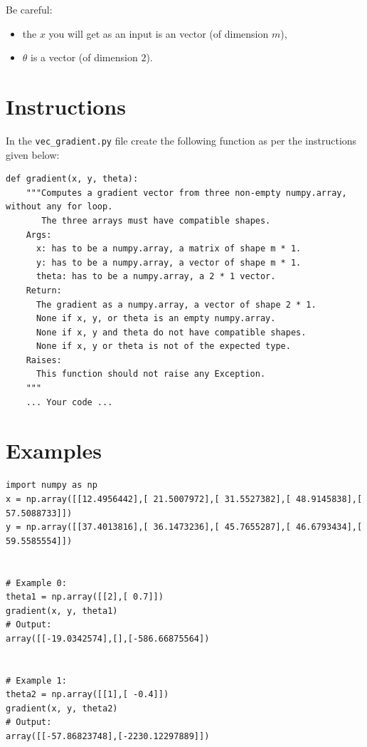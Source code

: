 \documentclass{42-en}
\begin{document}
Be careful:
\begin{itemize}
  \item the $x$ you will get as an input is an vector (of dimension $m$),
  \item $\theta$ is a vector (of dimension $2$).
\end{itemize}

\section*{Instructions}
In the \texttt{vec\_gradient.py} file create the following function as per the instructions given below:
\par
\begin{verbatim}
def gradient(x, y, theta):
    """Computes a gradient vector from three non-empty numpy.array, without any for loop.
       The three arrays must have compatible shapes.
    Args:
      x: has to be a numpy.array, a matrix of shape m * 1.
      y: has to be a numpy.array, a vector of shape m * 1.
      theta: has to be a numpy.array, a 2 * 1 vector.
    Return:
      The gradient as a numpy.array, a vector of shape 2 * 1.
      None if x, y, or theta is an empty numpy.array.
      None if x, y and theta do not have compatible shapes.
      None if x, y or theta is not of the expected type.
    Raises:
      This function should not raise any Exception.
    """
    ... Your code ...
\end{verbatim}

\section*{Examples}

\begin{verbatim}
import numpy as np
x = np.array([[12.4956442],[ 21.5007972],[ 31.5527382],[ 48.9145838],[ 57.5088733]])
y = np.array([[37.4013816],[ 36.1473236],[ 45.7655287],[ 46.6793434],[ 59.5585554]])


# Example 0:
theta1 = np.array([[2],[ 0.7]])
gradient(x, y, theta1)
# Output:
array([[-19.0342574],[],[-586.66875564])


# Example 1:
theta2 = np.array([[1],[ -0.4]])
gradient(x, y, theta2)
# Output:
array([[-57.86823748],[-2230.12297889]])
\end{verbatim}
\end{document}
